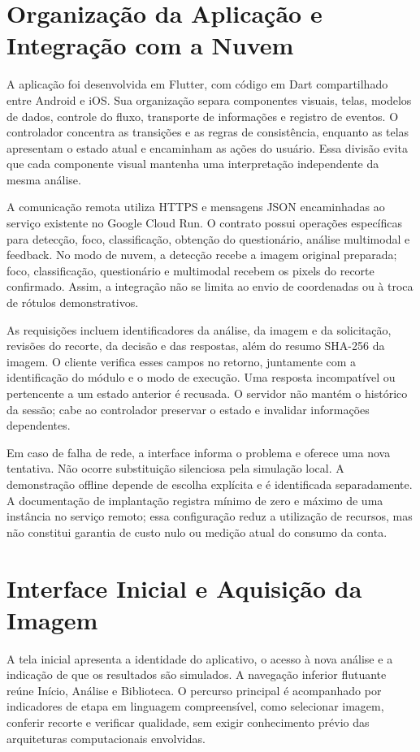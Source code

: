 \section{Organização da Aplicação e Integração com a Nuvem}
A aplicação foi desenvolvida em Flutter, com código em Dart compartilhado entre Android e iOS. Sua organização separa componentes visuais, telas, modelos de dados, controle do fluxo, transporte de informações e registro de eventos. O controlador concentra as transições e as regras de consistência, enquanto as telas apresentam o estado atual e encaminham as ações do usuário. Essa divisão evita que cada componente visual mantenha uma interpretação independente da mesma análise.

A comunicação remota utiliza HTTPS e mensagens JSON encaminhadas ao serviço existente no Google Cloud Run. O contrato possui operações específicas para detecção, foco, classificação, obtenção do questionário, análise multimodal e feedback. No modo de nuvem, a detecção recebe a imagem original preparada; foco, classificação, questionário e multimodal recebem os pixels do recorte confirmado. Assim, a integração não se limita ao envio de coordenadas ou à troca de rótulos demonstrativos.

As requisições incluem identificadores da análise, da imagem e da solicitação, revisões do recorte, da decisão e das respostas, além do resumo SHA-256 da imagem. O cliente verifica esses campos no retorno, juntamente com a identificação do módulo e o modo de execução. Uma resposta incompatível ou pertencente a um estado anterior é recusada. O servidor não mantém o histórico da sessão; cabe ao controlador preservar o estado e invalidar informações dependentes.

Em caso de falha de rede, a interface informa o problema e oferece uma nova tentativa. Não ocorre substituição silenciosa pela simulação local. A demonstração offline depende de escolha explícita e é identificada separadamente. A documentação de implantação registra mínimo de zero e máximo de uma instância no serviço remoto; essa configuração reduz a utilização de recursos, mas não constitui garantia de custo nulo ou medição atual do consumo da conta.

\section{Interface Inicial e Aquisição da Imagem}
A tela inicial apresenta a identidade do aplicativo, o acesso à nova análise e a indicação de que os resultados são simulados. A navegação inferior flutuante reúne Início, Análise e Biblioteca. O percurso principal é acompanhado por indicadores de etapa em linguagem compreensível, como selecionar imagem, conferir recorte e verificar qualidade, sem exigir conhecimento prévio das arquiteturas computacionais envolvidas.

